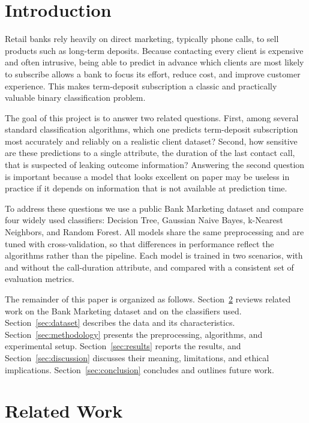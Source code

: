 \documentclass[conference]{IEEEtran}
\begin{document}
	\section{Introduction}
	\label{sec:introduction}

	Retail banks rely heavily on direct marketing, typically phone calls, to sell
	products such as long-term deposits. Because contacting every client is
	expensive and often intrusive, being able to predict in advance which clients
	are most likely to subscribe allows a bank to focus its effort, reduce cost,
	and improve customer experience. This makes term-deposit subscription a
	classic and practically valuable binary classification problem.

	The goal of this project is to answer two related questions. First, among
	several standard classification algorithms, which one predicts term-deposit
	subscription most accurately and reliably on a realistic client dataset?
	Second, how sensitive are these predictions to a single attribute, the
	duration of the last contact call, that is suspected of leaking outcome
	information? Answering the second question is important because a model that
	looks excellent on paper may be useless in practice if it depends on
	information that is not available at prediction time.

	To address these questions we use a public Bank Marketing dataset and compare
	four widely used classifiers: Decision Tree, Gaussian Naive Bayes,
	k-Nearest Neighbors, and Random Forest. All models share the same
	preprocessing and are tuned with cross-validation, so that differences in
	performance reflect the algorithms rather than the pipeline. Each model is
	trained in two scenarios, with and without the call-duration attribute, and
	compared with a consistent set of evaluation metrics.

	The remainder of this paper is organized as follows.
	Section~\ref{sec:related_work} reviews related work on the Bank Marketing
	dataset and on the classifiers used. Section~\ref{sec:dataset} describes the
	data and its characteristics. Section~\ref{sec:methodology} presents the
	preprocessing, algorithms, and experimental setup.
	Section~\ref{sec:results} reports the results, and
	Section~\ref{sec:discussion} discusses their meaning, limitations, and
	ethical implications. Section~\ref{sec:conclusion} concludes and outlines
	future work.

	\section{Related Work}
	\label{sec:related_work}
\end{document}
